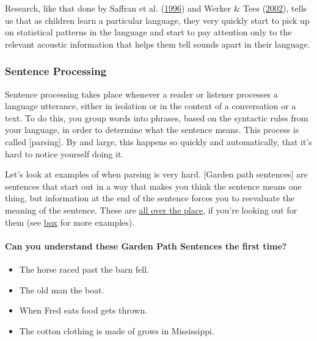 \documentclass[
]{krantz}
\providecommand{\tightlist}{%
  \setlength{\itemsep}{0pt}\setlength{\parskip}{0pt}}
\begin{document}
Research, like that done by Saffran et al. (\protect\hyperlink{ref-saffran1996}{1996}) and Werker \& Tees (\protect\hyperlink{ref-Werker2002}{2002}), tells us that as children learn a particular language, they very quickly start to pick up on statistical patterns in the language and start to pay attention only to the relevant acoustic information that helps them tell sounds apart in their language.

\hypertarget{sentence-processing}{%
\subsubsection*{Sentence Processing}\label{sentence-processing}}


Sentence processing takes place whenever a reader or listener processes a language utterance, either in isolation or in the context of a conversation or a text. To do this, you group words into phrases, based on the syntactic rules from your language, in order to determine what the sentence means. This process is called {[}parsing{]}. By and large, this happens so quickly and automatically, that it's hard to notice yourself doing it.

Let's look at examples of when parsing is very hard. {[}Garden path sentences{]} are sentences that start out in a way that makes you think the sentence means one thing, but information at the end of the sentence forces you to reevaluate the meaning of the sentence. These are \href{https://www.theguardian.com/world/2018/apr/10/spanish-politicians-urged-to-resign-over-fake-degree-claims}{all over the place}, if you're looking out for them (see \protect\hyperlink{can-you-understand-these-garden-path-sentences-the-first-time}{box} for more examples).

\hypertarget{can-you-understand-these-garden-path-sentences-the-first-time}{%
\paragraph*{Can you understand these Garden Path Sentences the first time?}\label{can-you-understand-these-garden-path-sentences-the-first-time}}

\begin{itemize}
\tightlist
\item
  The horse raced past the barn fell.
\item
  The old man the boat.
\item
  When Fred eats food gets thrown.
\item
  The cotton clothing is made of grows in Mississippi.
\end{itemize}
\end{document}
